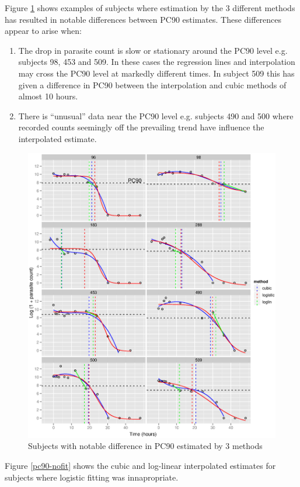 Figure \ref{pc90-bad} shows examples of subjects where estimation by the 3 different methods has resulted in notable differences between PC90 estimates. These differences appear to arise when:
\begin{enumerate}
\item The drop in parasite count is slow or stationary around the PC90 level e.g. subjects 98, 453 and 509. In these cases the regression lines and interpolation may cross the PC90 level at markedly different times. In subject 509 this has given a difference in PC90 between the interpolation and cubic methods of almost 10 hours.
\item There is ``unusual'' data near the PC90 level e.g. subjects 490 and 500 where recorded counts seemingly off the prevailing trend have influence the interpolated estimate.
\end{enumerate}
\begin{figure}[h]
\includegraphics[width=6.5in]{pc90-bad.eps} 
\caption{Subjects with notable difference in PC90 estimated by 3 methods}
\label{pc90-bad}
\end{figure}
Figure \ref{pc90-nofit} shows the cubic and log-linear interpolated estimates for subjects where logistic fitting was innapropriate.
